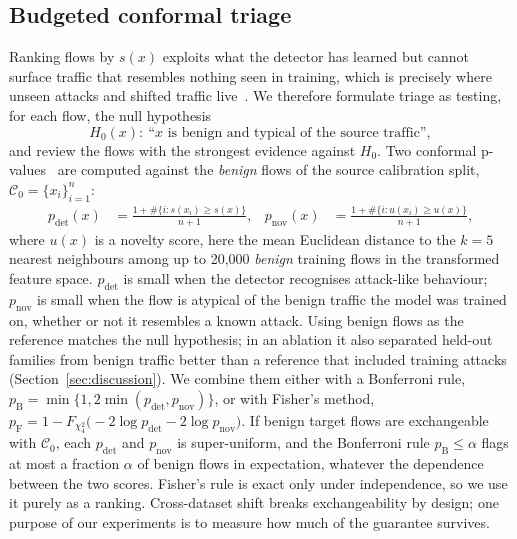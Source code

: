 \subsection{Budgeted conformal triage}\label{sec:triage}
Ranking flows by $s(x)$ exploits what the detector has learned but cannot surface traffic that resembles nothing seen in training, which is precisely where unseen attacks and shifted traffic live~\cite{sommer2010outside}. We therefore formulate triage as testing, for each flow, the null hypothesis
\[
H_0(x):\ \text{``$x$ is benign and typical of the source traffic''},
\]
and review the flows with the strongest evidence against $H_0$. Two conformal p-values~\cite{vovk2022algorithmic,angelopoulos2023conformal,bates2023testing} are computed against the \emph{benign} flows of the source calibration split, $\mathcal{C}_0=\{x_i\}_{i=1}^{n}$:
\begin{align}
p_{\mathrm{det}}(x) &= \frac{1+\#\{i: s(x_i)\ge s(x)\}}{n+1}, &
p_{\mathrm{nov}}(x) &= \frac{1+\#\{i: u(x_i)\ge u(x)\}}{n+1},
\end{align}
where $u(x)$ is a novelty score, here the mean Euclidean distance to the $k=5$ nearest neighbours among up to 20{,}000 \emph{benign} training flows in the transformed feature space. $p_{\mathrm{det}}$ is small when the detector recognises attack-like behaviour; $p_{\mathrm{nov}}$ is small when the flow is atypical of the benign traffic the model was trained on, whether or not it resembles a known attack. Using benign flows as the reference matches the null hypothesis; in an ablation it also separated held-out families from benign traffic better than a reference that included training attacks (Section~\ref{sec:discussion}). We combine them either with a Bonferroni rule, $p_{\mathrm{B}}=\min\{1,2\min(p_{\mathrm{det}},p_{\mathrm{nov}})\}$, or with Fisher's method, $p_{\mathrm{F}}=1-F_{\chi^2_4}\!\big(-2\log p_{\mathrm{det}}-2\log p_{\mathrm{nov}}\big)$. If benign target flows are exchangeable with $\mathcal{C}_0$, each $p_{\mathrm{det}}$ and $p_{\mathrm{nov}}$ is super-uniform, and the Bonferroni rule $p_{\mathrm{B}}\le\alpha$ flags at most a fraction $\alpha$ of benign flows in expectation, whatever the dependence between the two scores. Fisher's rule is exact only under independence, so we use it purely as a ranking. Cross-dataset shift breaks exchangeability by design; one purpose of our experiments is to measure how much of the guarantee survives.

